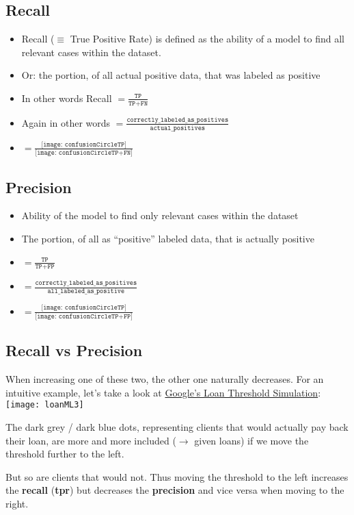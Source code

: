 \documentclass[12pt,a4paper]{article}
\begin{document}
\subsection{Recall}
\begin{itemize}
\item Recall ($\equiv$ True Positive Rate) is defined as the ability of a model to find all relevant cases within the dataset.
\item Or: the portion, of all actual positive data, that was labeled as positive
\item In other words Recall $= \frac{\texttt{TP}}{\texttt{TP} + \texttt{FN}}$
\item Again in other words $ =\frac{\texttt{correctly\_labeled\_as\_positives}}{\texttt{actual\_positives}}$
\item $=\frac{\texttt{[image: confusionCircleTP]}}{\texttt{[image: confusionCircleTP+FN]}}$
\end{itemize}
\subsection{Precision}
\begin{itemize}
\item Ability of the model to find only relevant cases within the dataset
\item The portion, of all as ``positive'' labeled data, that is actually positive
\item $= \frac{\texttt{TP}}{\texttt{TP} + \texttt{FP}}$
\item $= \frac{\texttt{correctly\_labeled\_as\_positives}}{\texttt{all\_labeled\_as\_positive}}$
\item $=\frac{\texttt{[image: confusionCircleTP]}}{\texttt{[image: confusionCircleTP+FP]}}$
\end{itemize}
\subsection*{Recall vs Precision}
When increasing one of these two, the other one naturally decreases. For an intuitive example, let's take a look at \href{https://research.google.com/bigpicture/attacking-discrimination-in-ml/}{Google's Loan Threshold Simulation}:\\
\texttt{[image: loanML3]}\\
\begin{description}
\item The dark grey / dark blue dots, representing clients that would actually pay back their loan, are more and more included ($\rightarrow$ given loans) if we move the threshold further to the left.
\item But so are clients that would not. Thus moving the threshold to the left increases the \textbf{recall} (\textbf{tpr}) but decreases the \textbf{precision} and vice versa when moving to the right.
\end{description}
\end{document}
